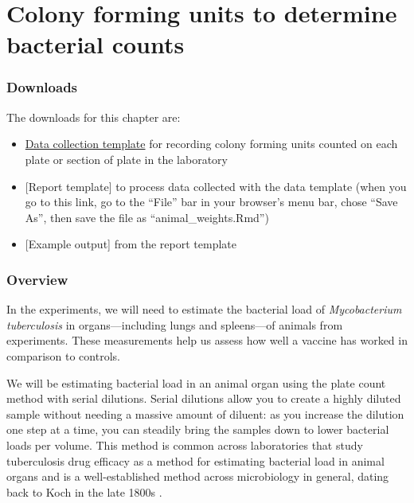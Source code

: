 \documentclass[
]{book}
\providecommand{\tightlist}{%
  \setlength{\itemsep}{0pt}\setlength{\parskip}{0pt}}
\begin{document}
\hypertarget{colony-forming-units-to-determine-bacterial-counts}{%
\chapter{Colony forming units to determine bacterial counts}\label{colony-forming-units-to-determine-bacterial-counts}}

\hypertarget{downloads-1}{%
\subsection{Downloads}\label{downloads-1}}

The downloads for this chapter are:

\begin{itemize}
\tightlist
\item
  \href{https://github.com/csu-impactb/CODING-TEAM-BOOKDOWN-/raw/main/templates/data_collection_templates/cfu_collection_template.xlsx}{Data collection template} for recording colony forming units counted on each
  plate or section of plate in the laboratory
\item
  {[}Report template{]} to process data collected with the data template (when you go to this link, go to the ``File'' bar in your browser's menu bar, chose ``Save As'', then save the file as ``animal\_weights.Rmd'')
\item
  {[}Example output{]} from the report template
\end{itemize}

\hypertarget{overview-2}{%
\subsection{Overview}\label{overview-2}}

In the experiments, we will need to estimate the bacterial load of
\emph{Mycobacterium tuberculosis} in organs---including lungs and spleens---of
animals from experiments. These measurements help us assess how well a vaccine
has worked in comparison to controls.

We will be estimating bacterial load in an animal organ using the plate count
method with serial dilutions. Serial dilutions allow you to create a
highly diluted sample without needing a massive amount of diluent: as you
increase the dilution one step at a time, you can steadily bring the samples
down to lower bacterial loads per volume. This method is common across
laboratories that study tuberculosis drug efficacy as a method for estimating
bacterial load in animal organs \citep{franzblau2012comprehensive} and is a
well-established method across microbiology in general, dating back to Koch in
the late 1800s \citep{wilson1922proportion, ben2014estimation}.
\end{document}
